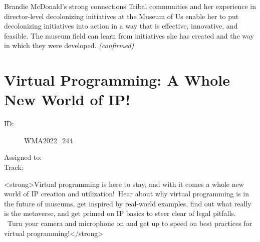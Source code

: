 \documentclass{report}
\begin{document}
                

                Brandie McDonald’s strong connections Tribal communities and her experience in director-level decolonizing initiatives at the Museum of Us enable her to put decolonizing initiatives into action in a way that is effective, innovative, and feasible. The museum field can learn from initiatives she has created and the way in which they were developed.
                \emph{ (confirmed) }
              

              

              
        
          \newpage
          \section{ Virtual Programming:  A Whole New World of IP! }
            \begin{description}
              \item [ID:]
              WMA2022\_244

              \item [Assigned to:]
                \item [Track:]
              \end{description}

              <strong>Virtual programming is here to stay, and with it comes a whole new world of IP creation and utilization! Hear about why virtual programming is in the future of museums, get inspired by real-world examples, find out what really is the metaverse, and get primed on IP basics to steer clear of legal pitfalls.  Turn your camera and microphone on and get up to speed on best practices for virtual programming!</strong>
\end{document}
